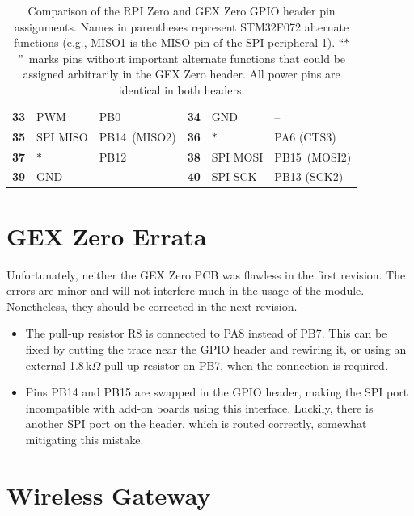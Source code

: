 \begin{table}[h]
\begin{tabularx}{\textwidth}{W{.1\textwidth}XX|W{.1\textwidth}XX}
	    	\midrule
	    	\textbf{33} & PWM & PB0 
	    	& \textbf{34} & \leavevmode\color{blue}GND & -- \\
	    	\textbf{35} & SPI MISO & PB14~(MISO2)
	    	& \textbf{36} &  $\ast$ & PA6 (CTS3) \\
	    	\textbf{37} & $\ast$ & PB12
	    	& \textbf{38} & SPI MOSI & PB15~(MOSI2)\\
	    	\textbf{39} & \leavevmode\color{blue}GND & -- 
	    	& \textbf{40} & SPI SCK & PB13 (SCK2)\\
	    	\bottomrule 
	    \end{tabularx}
	\caption[Comparison of the RPI Zero and GEX Zero GPIO headers]{\label{tbl:gz_rpi_compare}
		Comparison of the RPI Zero and GEX Zero GPIO header pin assignments. Names in parentheses represent STM32F072 alternate functions (e.g., MISO1 is the MISO pin of the SPI peripheral 1). ``$\ast$''~marks pins without important alternate functions that could be assigned arbitrarily in the GEX Zero header. All power pins are identical in both headers.
	}
\end{table}

\section{GEX Zero Errata}

Unfortunately, neither the GEX Zero \gls{PCB} was flawless in the first revision. The errors are minor and will not interfere much in the usage of the module. Nonetheless, they should be corrected in the next revision.

\begin{itemize}[itemsep=0pt]
	\item The \IIC pull-up resistor R8 is connected to PA8 instead of PB7. This can be fixed by cutting the trace near the \gls{GPIO} header and rewiring it, or using an external 1.8\,k$\Omega$ pull-up resistor on PB7, when the \IIC connection is required.
	\item Pins PB14 and PB15 are swapped in the \gls{GPIO} header, making the SPI port incompatible with add-on boards using this interface. Luckily, there is another SPI port on the header, which is routed correctly, somewhat mitigating this mistake.
\end{itemize}

\section{Wireless Gateway} \label{sec:rfgateway}

